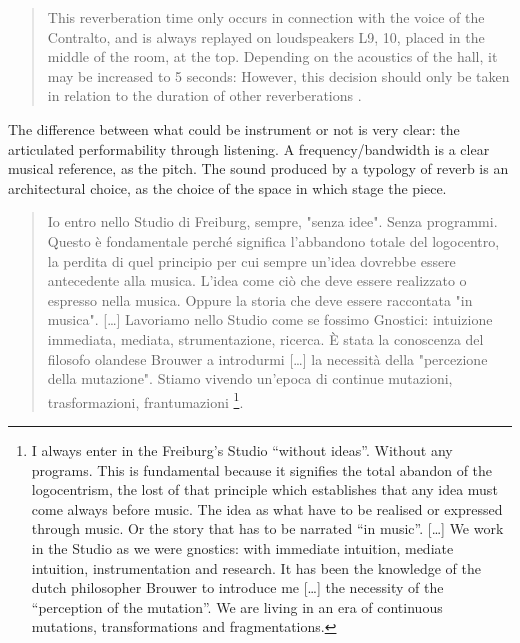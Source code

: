\documentclass[twoside,a4paper]{article}
\begin{document}
\begin{quote}
This reverberation time only occurs in connection with the voice of the Contralto, and is always replayed on loudspeakers L9, 10, placed in the middle of the room, at the top. Depending on the acoustics of the hall, it may be increased to 5 seconds: However, this decision should only be taken in relation to the duration of other reverberations \cite{nlre87}.
\end{quote}

The difference between what could be instrument or not is very clear: the articulated performability through listening. A frequency/bandwidth is a clear musical reference, as the pitch. The sound produced by a typology of reverb is an architectural choice, as the choice of the space in which stage the piece. 

\begin{quote}
Io entro nello Studio di Freiburg, sempre, "senza idee". Senza programmi. Questo è fondamentale perché significa l'abbandono totale del logocentro, la perdita di quel principio per cui sempre un'idea dovrebbe essere antecedente alla musica. L'idea come ciò che deve essere realizzato o espresso nella musica. Oppure la storia che deve essere raccontata "in musica". [\ldots] %
Lavoriamo nello Studio come se fossimo Gnostici: intuizione immediata, mediata, strumentazione, ricerca. È stata la conoscenza del filosofo olandese Brouwer a introdurmi [\ldots] la necessità della "percezione della mutazione". Stiamo vivendo un'epoca di continue mutazioni, trasformazioni, frantumazioni \cite{nono85}\footnote{I always enter in the Freiburg’s Studio “without ideas”. Without any programs. This is fundamental because it signifies the total abandon of the logocentrism, the lost of that principle which establishes that any idea must come always before music. The idea as what have to be realised or expressed through music. Or the story that has to be narrated “in music”. [\dots] We work in the Studio as we were gnostics: with immediate intuition, mediate intuition, instrumentation and research. It has been the knowledge of the dutch philosopher Brouwer to introduce me [\dots] the necessity of the “perception of the mutation”. We are living in an era of continuous mutations, transformations and fragmentations.}. 
\end{quote}
\end{document}
